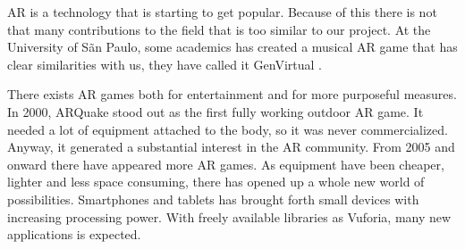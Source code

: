 \gls{AR} is a technology that is starting to get popular. Because of this there
is not that many contributions to the field that is too similar to our project.
At the University of S\~{a}n Paulo, some academics has created a musical AR game
that has clear similarities with us, they have called it GenVirtual
\cite{GenVirtual}. 

There exists AR games both for entertainment and for more purposeful
measures\cite{tan2010augmented}. In 2000, ARQuake stood out as the first fully
working outdoor AR game. It needed a lot of equipment attached to the body, so
it was never commercialized. Anyway, it generated a substantial interest in the
AR community. From 2005 and onward there have appeared more AR games. As
equipment have been cheaper, lighter and less space consuming, there has opened
up a whole new world of possibilities. Smartphones and tablets has brought forth
small devices with increasing processing power. With freely available libraries
as \gls{Vuforia}, many new applications is expected.